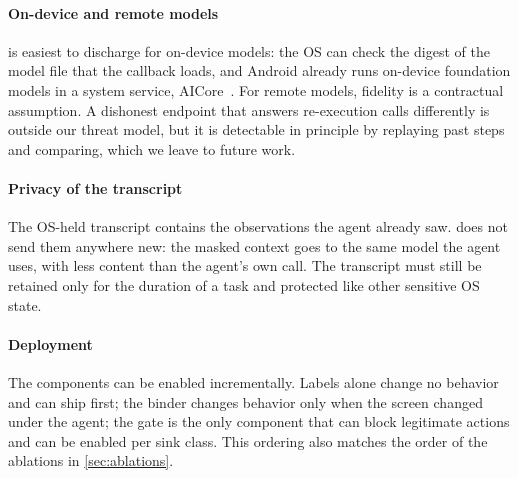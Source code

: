 \paragraph{On-device and remote models}
 is easiest to discharge for on-device models: the OS can check the digest of the model file that the callback loads, and Android already runs on-device foundation models in a system service, AICore~\cite{google2026gemininano}. For remote models, fidelity is a contractual assumption. A dishonest endpoint that answers re-execution calls differently is outside our threat model, but it is detectable in principle by replaying past steps and comparing, which we leave to future work.

\paragraph{Privacy of the transcript}
The OS-held transcript contains the observations the agent already saw. \PG{} does not send them anywhere new: the masked context goes to the same model the agent uses, with less content than the agent's own call. The transcript must still be retained only for the duration of a task and protected like other sensitive OS state.

\paragraph{Deployment}
The components can be enabled incrementally. Labels alone change no behavior and can ship first; the binder changes behavior only when the screen changed under the agent; the gate is the only component that can block legitimate actions and can be enabled per sink class. This ordering also matches the order of the ablations in \cref{sec:ablations}.
